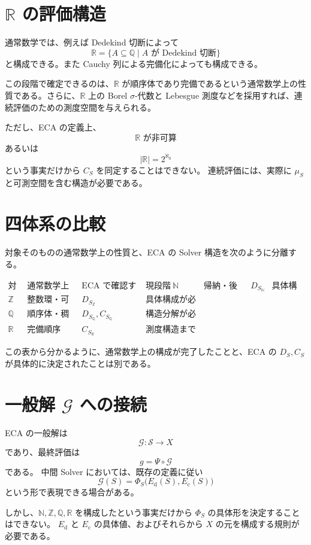 \documentclass[a4paper,11pt]{article}
\newcommand{\Solver}{\mathcal{S}}
\newcommand{\N}{\mathbb{N}}
\newcommand{\Z}{\mathbb{Z}}
\newcommand{\Q}{\mathbb{Q}}
\newcommand{\R}{\mathbb{R}}
\begin{document}
\section{$\mathbb{R}$ の評価構造}
通常数学では、例えば Dedekind 切断によって
\[
\R=\{A \subseteq \Q \mid A \text{ が Dedekind 切断}
\}
\]
と構成できる。また Cauchy 列による完備化によっても構成できる。

この段階で確定できるのは、$\R$ が順序体であり完備であるという通常数学上の性質である。さらに、$\R$ 上の Borel $\sigma$-代数と Lebesgue 測度などを採用すれば、連続評価のための測度空間を与えられる。

ただし、ECA の定義上、
\[
\R\text{ が非可算}
\]
あるいは
\[
|\R|=2^{\aleph_0}
\]
という事実だけから $C_S$ を同定することはできない。
連続評価には、実際に $\mu_S$ と可測空間を含む構造が必要である。

\section{四体系の比較}
対象そのものの通常数学上の性質と、ECA の Solver 構造を次のように分離する。

\[
\begin{array}{c|c|c|c}
\text{対象}&\text{通常数学上の構造}&\text{ECA で確認すべき構造}&\text{現段階}\
\hline
\N&\text{帰納・後者・可算}&D_{S_{\N}}&\text{具体構成が必要}\\
\Z&\text{整数環・可算}&D_{S_{\Z}}&\text{具体構成が必要}\\
\Q&\text{順序体・稠密・可算}&D_{S_{\Q}},C_{S_{\Q}}&\text{構造分解が必要}\\
\R&\text{完備順序体・連続解析}&C_{S_{\R}}&\text{測度構造まで指定が必要}
\end{array}
\]

この表から分かるように、通常数学上の構成が完了したことと、ECA の $D_S,C_S$ が具体的に決定されたことは別である。

\section{一般解 $\mathcal G$ への接続}
ECA の一般解は
\[
\boxed{\mathcal G:\Solver\to X}
\]
であり、最終評価は
\[
\boxed{g=\Psi\circ\mathcal G}
\]
である。
中間 Solver においては、既存の定義に従い
\[
\boxed{
\mathcal G(S)=\Phi_S\bigl(E_{\mathrm{d}}(S),E_{\mathrm{c}}(S)\bigr)
}
\]
という形で表現できる場合がある。

しかし、$\N,\Z,\Q,\R$ を構成したという事実だけから $\Phi_S$ の具体形を決定することはできない。
$E_{\mathrm{d}}$ と $E_{\mathrm{c}}$ の具体値、およびそれらから $X$ の元を構成する規則が必要である。
\end{document}
